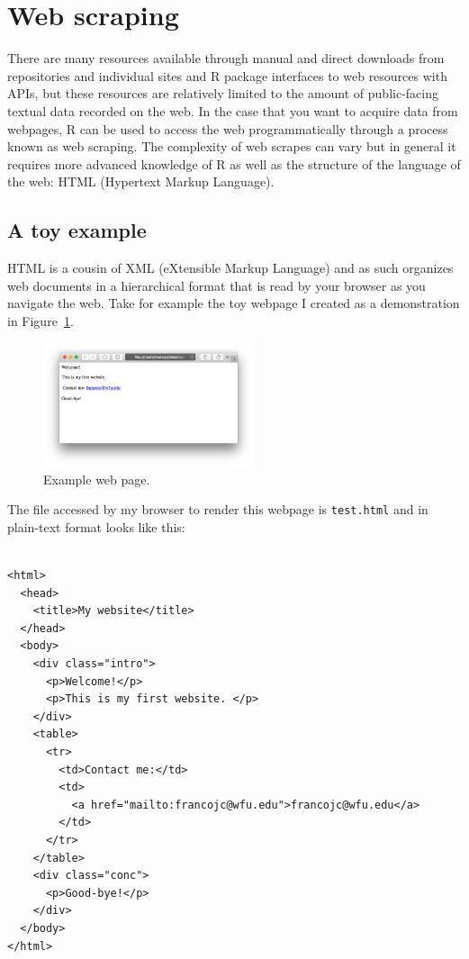 \documentclass[
  letterpaper,
]{scrbook}
\begin{document}
\hypertarget{web-scraping}{%
\section{Web scraping}\label{web-scraping}}

There are many resources available through manual and direct downloads
from repositories and individual sites and R package interfaces to web
resources with APIs, but these resources are relatively limited to the
amount of public-facing textual data recorded on the web. In the case
that you want to acquire data from webpages, R can be used to access the
web programmatically through a process known as web scraping. The
complexity of web scrapes can vary but in general it requires more
advanced knowledge of R as well as the structure of the language of the
web: HTML (Hypertext Markup Language).

\hypertarget{a-toy-example}{%
\subsection{A toy example}\label{a-toy-example}}

HTML is a cousin of XML (eXtensible Markup Language) and as such
organizes web documents in a hierarchical format that is read by your
browser as you navigate the web. Take for example the toy webpage I
created as a demonstration in Figure~\ref{fig-ad-example-webpage}.

\begin{figure}[h]

{\centering \includegraphics[width=2.44in,height=\textheight]{./figures/acquire-data/example-webpage.png}

}

\caption{\label{fig-ad-example-webpage}Example web page.}

\end{figure}

The file accessed by my browser to render this webpage is
\texttt{test.html} and in plain-text format looks like this:

\begin{verbatim}

<html>
  <head>
    <title>My website</title>
  </head>
  <body>
    <div class="intro">
      <p>Welcome!</p>
      <p>This is my first website. </p>
    </div>
    <table>
      <tr>
        <td>Contact me:</td>
        <td>
          <a href="mailto:francojc@wfu.edu">francojc@wfu.edu</a>
        </td>
      </tr>
    </table>
    <div class="conc">
      <p>Good-bye!</p>
    </div>
  </body>
</html>
\end{verbatim}
\end{document}
